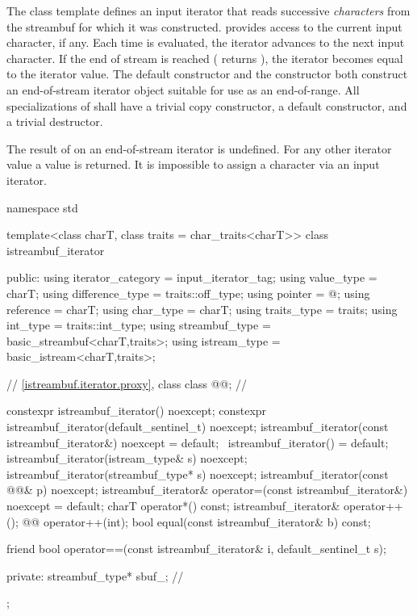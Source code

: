 \pnum
The
class template
defines an input iterator that
reads successive
\textit{characters}
from the streambuf for which it was constructed.
provides access to the current input character, if any.
Each time
is evaluated, the iterator advances to the next input character.
If the end of stream is reached ( returns
),
the iterator becomes equal to the
iterator value.
The default constructor
and the constructor
both construct an end-of-stream iterator object suitable for use
as an end-of-range.
All specializations of  shall have a trivial copy
constructor, a  default constructor, and a trivial destructor.

\pnum
The result of
on an end-of-stream iterator is undefined.
%
For any other iterator value a
value is returned.
It is impossible to assign a character via an input iterator.

%
\begin{codeblock}
namespace std {
  template<class charT, class traits = char_traits<charT>>
  class istreambuf_iterator {
  public:
    using iterator_category = input_iterator_tag;
    using value_type        = charT;
    using difference_type   = traits::off_type;
    using pointer           = @\unspec@;
    using reference         = charT;
    using char_type         = charT;
    using traits_type       = traits;
    using int_type          = traits::int_type;
    using streambuf_type    = basic_streambuf<charT,traits>;
    using istream_type      = basic_istream<charT,traits>;

    // \ref{istreambuf.iterator.proxy}, class 
    class @@;                          // \expos

    constexpr istreambuf_iterator() noexcept;
    constexpr istreambuf_iterator(default_sentinel_t) noexcept;
    istreambuf_iterator(const istreambuf_iterator&) noexcept = default;
    ~istreambuf_iterator() = default;
    istreambuf_iterator(istream_type& s) noexcept;
    istreambuf_iterator(streambuf_type* s) noexcept;
    istreambuf_iterator(const @@& p) noexcept;
    istreambuf_iterator& operator=(const istreambuf_iterator&) noexcept = default;
    charT operator*() const;
    istreambuf_iterator& operator++();
    @@ operator++(int);
    bool equal(const istreambuf_iterator& b) const;

    friend bool operator==(const istreambuf_iterator& i, default_sentinel_t s);

  private:
    streambuf_type* sbuf_;              // \expos
  };
}
\end{codeblock}

